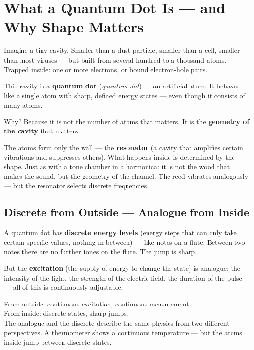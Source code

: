 
\section{What a Quantum Dot Is --- and Why Shape Matters}

Imagine a tiny cavity. Smaller than a dust particle,
smaller than a cell, smaller than most viruses --- but built
from several hundred to a thousand atoms. Trapped inside:
one or more electrons, or bound electron-hole pairs.

This cavity is a \textbf{quantum dot} (\textit{quantum dot}) ---
an artificial atom. It behaves like a single atom with
sharp, defined energy states --- even though it consists of many atoms.

Why? Because it is not the number of atoms that matters.
It is the \textbf{geometry of the cavity} that matters.

The atoms form only the wall --- the \textbf{resonator}
(a cavity that amplifies certain vibrations and suppresses others).
What happens inside is determined by the shape. Just as with a
tone chamber in a harmonica: it is not the wood that makes the sound,
but the geometry of the channel. The reed vibrates analogously ---
but the resonator selects discrete frequencies.

\subsection{Discrete from Outside --- Analogue from Inside}

A quantum dot has \textbf{discrete energy levels}
(energy steps that can only take certain specific values,
nothing in between) --- like notes on a flute.
Between two notes there are no further tones on the flute.
The jump is sharp.

But the \textbf{excitation} (the supply of energy to change the state)
is analogue: the intensity of the light, the strength of the
electric field, the duration of the pulse --- all of this is
continuously adjustable.

\begin{keypoint}
From outside: continuous excitation, continuous measurement.\\
From inside: discrete states, sharp jumps.\\[4pt]
The analogue and the discrete describe the same physics
from two different perspectives.
A thermometer shows a continuous temperature ---
but the atoms inside jump between discrete states.
\end{keypoint}

